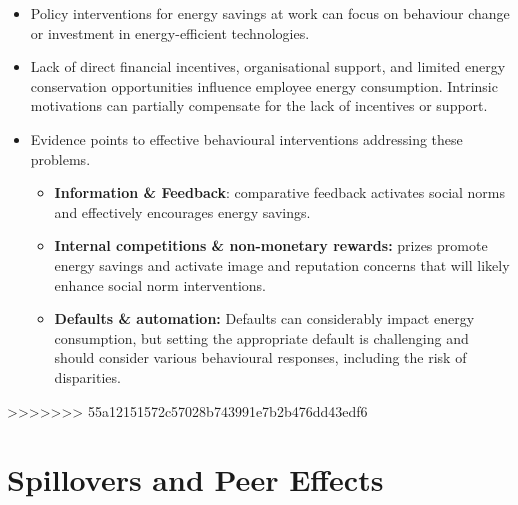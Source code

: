 \documentclass[
  12pt,
  captions=heading]{scrreport}
\begin{document}
\begin{itemize}
\item
  Policy interventions for energy savings at work can focus on behaviour
  change or investment in energy-efficient technologies.
\item
  Lack of direct financial incentives, organisational support, and
  limited energy conservation opportunities influence employee energy
  consumption. Intrinsic motivations can partially compensate for the
  lack of incentives or support.
\item
  Evidence points to effective behavioural interventions addressing
  these problems.

  \begin{itemize}
  \item
    \textbf{Information \& Feedback}: comparative feedback activates
    social norms and effectively encourages energy savings.
  \item
    \textbf{Internal competitions \& non-monetary rewards:} prizes
    promote energy savings and activate image and reputation concerns
    that will likely enhance social norm interventions.
  \item
    \textbf{Defaults \& automation:} Defaults can considerably impact
    energy consumption, but setting the appropriate default is
    challenging and should consider various behavioural responses,
    including the risk of disparities.
  \end{itemize}
\end{itemize}

>>>>>>> 55a12151572c57028b743991e7b2b476dd43edf6
\hypertarget{sec:spillovers}{%
\chapter{Spillovers and Peer Effects}\label{sec:spillovers}}
\end{document}
